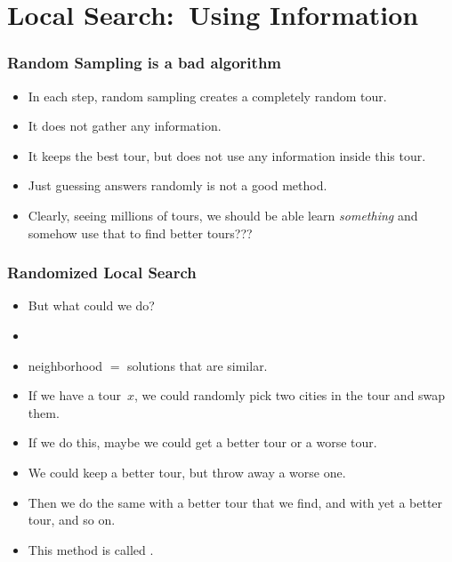 \documentclass[aspectratio=169,mathserif,notheorems]{beamer}%
\begin{document}
\section{Local Search:~Using Information}%
%
\begin{frame}%
\frametitle{Random Sampling is a bad algorithm}%
\begin{itemize}%
\item In each step, random sampling creates a completely random tour.%
\item<2-> It does not gather any information.%
\item<3-> It keeps the best tour, but does not use any information inside this tour.%
\item<4-> Just guessing answers randomly is not a good method.%
\item<5-> Clearly, seeing millions of tours, we should be able learn \emph{something} and somehow use that to find better tours???%
\end{itemize}%
\end{frame}%
%
\begin{frame}%
\frametitle{Randomized Local Search}%
%
\begin{itemize}%
\item But what could we do?%
%
\item<2-> %
%
\item<3-> neighborhood $=$ solutions that are similar.%
%
\item<4-> If we have a tour~$x$, we could randomly pick two cities in the tour and swap them.%
%
\item<5-> If we do this, maybe we could get a better tour or a worse tour.%
%
\item<6-> We could keep a better tour, but throw away a worse one.%
%
\item<7-> Then we do the same with a better tour that we find, and with yet a better tour, and so on.%
%
\item<8-> This method is called .%
\end{itemize}%
\end{frame}%
%
\end{document}
